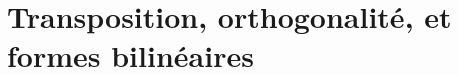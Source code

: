 \documentclass[./main]{subfiles}
\begin{document}
  \chapter{Transposition, orthogonalité, et formes bilinéaires}
  \minitoc
\end{document}
